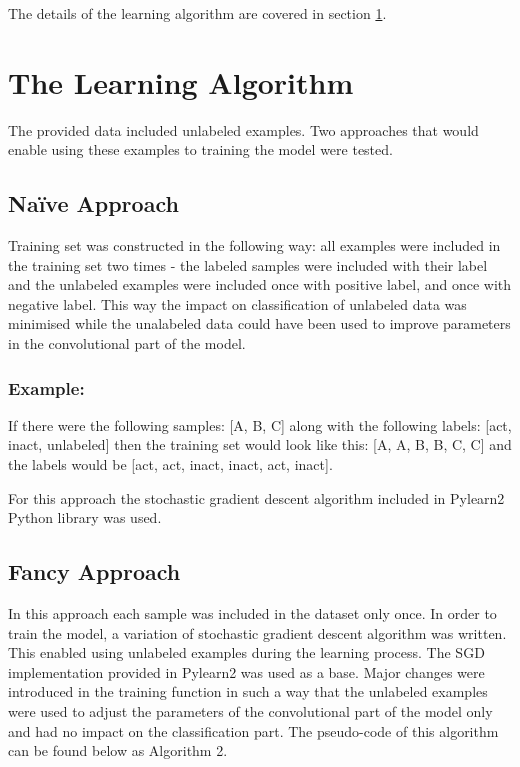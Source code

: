 \documentclass[a4paper,10pt]{report}
\begin{document}
	
	The details of the learning algorithm are covered in section \ref{sec:learning_algorithm}.	
	
      
    \section{The Learning Algorithm}\label{sec:learning_algorithm} 
    The provided data included unlabeled examples. Two approaches that would enable using these examples to training the model were tested. 
    
      \subsection{Na\"{i}ve Approach}
      Training set was constructed in the following way: all examples were included in the training set two times - the labeled samples were included with their label and the unlabeled examples were included once with positive label, and once with negative label. This way the impact on classification of unlabeled data was minimised while the unalabeled data could have been used to improve parameters in the convolutional part of the model. 
	  
      \subsubsection{Example:}
      If there were the following samples: [A, B, C] along with the following labels: [act, inact, unlabeled] then the training set would look like this: [A, A, B, B, C, C] and the labels would be [act, act, inact, inact, act, inact]. 
      
      For this approach the stochastic gradient descent algorithm included in Pylearn2 Python library was used. 
	  
      \subsection{Fancy Approach}
      In this approach each sample was included in the dataset only once. In order to train the model, a variation of stochastic gradient descent algorithm was written. This enabled using unlabeled examples during the learning process. The SGD implementation provided in Pylearn2 was used as a base. Major changes were introduced in the training function in such a way that the unlabeled examples were used to adjust the parameters of the convolutional part of the model only and had no impact on the classification part. The pseudo-code of this algorithm can be found below as Algorithm 2. 
      
\end{document}
